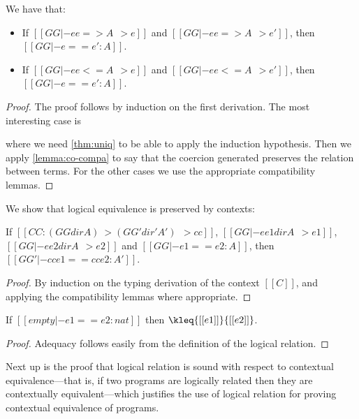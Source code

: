 \begin{theorem}  \label{thm:co-log} We have that:
  \begin{itemize}
  \item If $[[GG |- ee => A ~~> e]]$ and $[[GG |- ee => A ~~> e']]$, then $[[GG |- e == e' : A ]]$.
  \item If $[[GG |- ee <= A ~~> e]]$ and $[[GG |- ee <= A ~~> e']]$, then $[[GG |- e == e' : A ]]$.
  \end{itemize}
\end{theorem}
\begin{proof}
  The proof follows by induction on the first derivation. The most interesting
  case is 
  \begin{mathpar}
  \end{mathpar}
  where we need \cref{thm:uniq} to be able to apply the induction hypothesis.
  Then we apply \cref{lemma:co-compa} to say that the coercion generated
  preserves the relation between terms. For the other cases we use the
  appropriate compatibility lemmas.
\end{proof}


We show that logical equivalence is preserved by \namee contexts:

\begin{lemma}[Congruence] \label{lemma:cong}
 If $[[CC : (GG dir A) ~> (GG' dir' A') ~~> cc]]$, $[[GG |- ee1 dir A ~~> e1]]$, $[[GG |- ee2 dir A ~~> e2]]$
 and $[[GG |- e1 == e2 : A]]$, then $[[GG' |- cc{e1} == cc{e2} : A']]$.
\end{lemma}
\begin{proof}
  By induction on the typing derivation of the context $[[C]]$, and applying
  the compatibility lemmas where appropriate.
\end{proof}


\begin{lemma}[Adequacy] \label{lemma:ade}
  If $[[  empty |- e1 == e2 : nat ]]$ then $\kleq{[[e1]]}{[[e2]]}$.
\end{lemma}
\begin{proof}
  Adequacy follows easily from the definition of the logical relation.
\end{proof}


Next up is the proof that logical relation is sound with respect to contextual
equivalence---that is, if two programs are logically related then they are
contextually equivalent---which justifies the use of logical relation for
proving contextual equivalence of programs.

